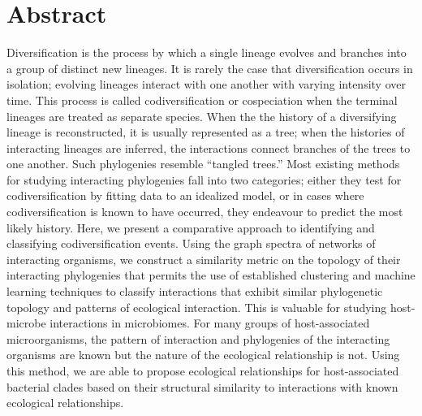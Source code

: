 \section{Abstract}

Diversification is the process by which a single lineage evolves and branches into a group of distinct new lineages. It is rarely the case that diversification occurs in isolation; evolving lineages interact with one another with varying intensity over time. This process is called codiversification or cospeciation when the terminal lineages are treated as separate species. When the the history of a diversifying lineage is reconstructed, it is usually represented as a tree; when the histories of interacting lineages are inferred, the interactions connect branches of the trees to one another. Such phylogenies resemble ``tangled trees.'' Most existing methods for studying interacting phylogenies fall into two categories; either they test for codiversification by fitting data to an idealized model, or in cases where codiversification is known to have occurred, they endeavour to predict the most likely history. Here, we present a comparative approach to identifying and classifying codiversification events. Using the graph spectra of networks of interacting organisms, we construct a similarity metric on the topology of their interacting phylogenies that permits the use of established clustering and machine learning techniques to classify interactions that exhibit similar phylogenetic topology and patterns of ecological interaction. This is valuable for studying host-microbe interactions in microbiomes. For many groups of host-associated microorganisms, the pattern of interaction and phylogenies of the interacting organisms are known but the nature of the ecological relationship is not. Using this method, we are able to propose ecological relationships for host-associated bacterial clades based on their structural similarity to interactions with known ecological relationships.
